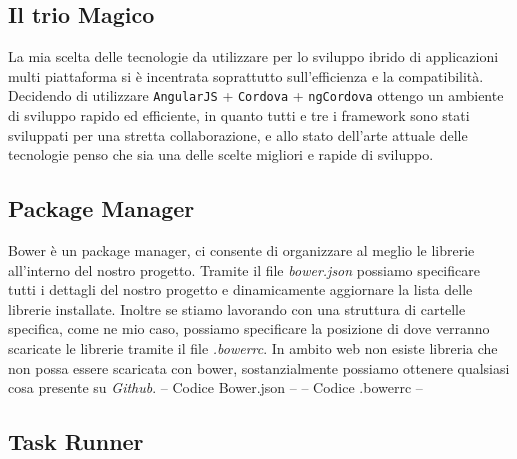 \subsection{Il trio Magico}
La mia scelta delle tecnologie da utilizzare per lo sviluppo ibrido di applicazioni multi piattaforma si è incentrata soprattutto sull'efficienza e la compatibilità. Decidendo di utilizzare \texttt{AngularJS} + \texttt{Cordova} + \texttt{ngCordova} ottengo un ambiente di sviluppo rapido ed efficiente, in quanto tutti e tre i framework sono stati sviluppati per una stretta collaborazione, e allo stato dell'arte attuale delle tecnologie penso che sia una delle scelte migliori e rapide di sviluppo.

\subsection{Package Manager}
Bower è un package manager, ci consente di organizzare al meglio le librerie all'interno del nostro progetto. Tramite il file \emph{bower.json} possiamo specificare tutti i dettagli del nostro progetto e dinamicamente aggiornare la lista delle librerie installate. Inoltre se stiamo lavorando con una struttura di cartelle specifica, come ne mio caso, possiamo specificare la posizione di dove verranno scaricate le librerie tramite il file \emph{.bowerrc}. In ambito web non esiste libreria che non possa essere scaricata con bower, sostanzialmente possiamo ottenere qualsiasi cosa presente su \emph{Github}.
-- Codice Bower.json --
-- Codice .bowerrc --

\subsection{Task Runner}

